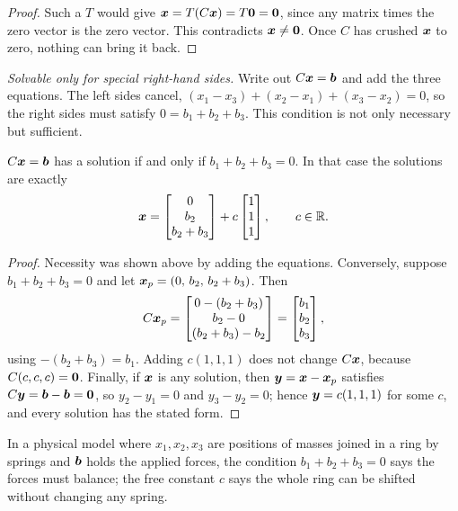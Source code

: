 \begin{proof}
Such a $T$ would give $\boldsymbol{x}=T(C\boldsymbol{x})=T\boldsymbol{0}=\boldsymbol{0}$, since any matrix times the zero
vector is the zero vector. This contradicts $\boldsymbol{x}\neq\boldsymbol{0}$. Once $C$ has crushed
$\boldsymbol{x}$ to zero, nothing can bring it back.
\end{proof}

\emph{Solvable only for special right-hand sides.} Write out $C\boldsymbol{x}=\boldsymbol{b}$ and add the
three equations. The left sides cancel, $(x_1-x_3)+(x_2-x_1)+(x_3-x_2)=0$, so the right
sides must satisfy $0=b_1+b_2+b_3$. This condition is not only necessary but sufficient.

\begin{proposition}\label{prop:u02-solvable}
$C\boldsymbol{x}=\boldsymbol{b}$ has a solution if and only if $b_1+b_2+b_3=0$. In that case the solutions
are exactly
\[
  \boldsymbol{x} = \begin{bmatrix} 0\\ b_2\\ b_2+b_3\end{bmatrix} + c\begin{bmatrix} 1\\ 1\\ 1\end{bmatrix},
  \qquad c\in\mathbb{R} .
\]
\end{proposition}

\begin{proof}
Necessity was shown above by adding the equations. Conversely, suppose $b_1+b_2+b_3=0$ and
let $\boldsymbol{x}_p=(0,\,b_2,\,b_2+b_3)$. Then
\[
  C\boldsymbol{x}_p = \begin{bmatrix} 0-(b_2+b_3)\\ b_2-0\\ (b_2+b_3)-b_2\end{bmatrix}
  = \begin{bmatrix} b_1\\ b_2\\ b_3\end{bmatrix},
\]
using $-(b_2+b_3)=b_1$. Adding $c(1,1,1)$ does not change $C\boldsymbol{x}$, because
$C(c,c,c)=\boldsymbol{0}$. Finally, if $\boldsymbol{x}$ is any solution, then $\boldsymbol{y}=\boldsymbol{x}-\boldsymbol{x}_p$ satisfies
$C\boldsymbol{y}=\boldsymbol{b}-\boldsymbol{b}=\boldsymbol{0}$, so $y_2-y_1=0$ and $y_3-y_2=0$; hence $\boldsymbol{y}=c(1,1,1)$ for
some $c$, and every solution has the stated form.
\end{proof}

In a physical model where $x_1,x_2,x_3$ are positions of masses joined in a ring by springs
and $\boldsymbol{b}$ holds the applied forces, the condition $b_1+b_2+b_3=0$ says the forces must
balance; the free constant $c$ says the whole ring can be shifted without changing any
spring.

